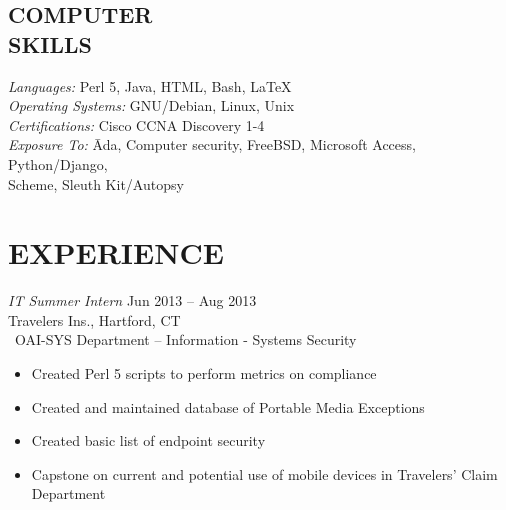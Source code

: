 \documentclass[margin]{res}
\begin{document}
\begin{resume}
\begin{tabbing}
\section{COMPUTER \\ SKILLS} {\sl Languages:} Perl 5, Java, HTML, Bash, \LaTeX\ \\
                             {\sl Operating Systems:} GNU/Debian, Linux, Unix \\
                             {\sl Certifications:} Cisco CCNA Discovery 1-4\\
                             {\sl Exposure To:} \= Ada, Computer security, FreeBSD,
                             Microsoft Access, Python/Django,\\ 
                             \> Scheme,  Sleuth Kit/Autopsy
                             \end{tabbing}
 
\section{EXPERIENCE} {\sl IT Summer Intern} \hfill Jun 2013 -- Aug 2013 \\
                     Travelers Ins., Hartford, CT\\\
                     OAI-SYS Department -- Information - Systems Security
                     \begin{itemize}  %
                         \item Created Perl 5 scripts to perform metrics on 
                         compliance
                         \item Created and maintained database of Portable 
                         Media Exceptions
                         \item Created basic list of endpoint security
                         \item Capstone on current and potential use of mobile 
                         devices in Travelers' Claim Department
                     \end{itemize}


\end{resume}
\end{document}
